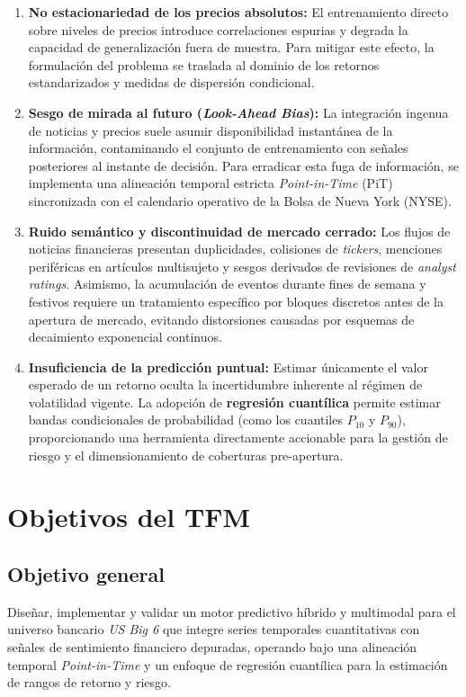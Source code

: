 \documentclass[11pt, a4paper]{report}
\begin{document}
\begin{enumerate}
    \item \textbf{No estacionariedad de los precios absolutos:} El entrenamiento directo sobre niveles de precios introduce correlaciones espurias y degrada la capacidad de generalización fuera de muestra. Para mitigar este efecto, la formulación del problema se traslada al dominio de los retornos estandarizados y medidas de dispersión condicional.
    \item \textbf{Sesgo de mirada al futuro (\textit{Look-Ahead Bias}):} La integración ingenua de noticias y precios suele asumir disponibilidad instantánea de la información, contaminando el conjunto de entrenamiento con señales posteriores al instante de decisión. Para erradicar esta fuga de información, se implementa una alineación temporal estricta \textit{Point-in-Time} (PiT) sincronizada con el calendario operativo de la Bolsa de Nueva York (NYSE).
    \item \textbf{Ruido semántico y discontinuidad de mercado cerrado:} Los flujos de noticias financieras presentan duplicidades, colisiones de \textit{tickers}, menciones periféricas en artículos multisujeto y sesgos derivados de revisiones de \textit{analyst ratings}. Asimismo, la acumulación de eventos durante fines de semana y festivos requiere un tratamiento específico por bloques discretos antes de la apertura de mercado, evitando distorsiones causadas por esquemas de decaimiento exponencial continuos.
    \item \textbf{Insuficiencia de la predicción puntual:} Estimar únicamente el valor esperado de un retorno oculta la incertidumbre inherente al régimen de volatilidad vigente. La adopción de \textbf{regresión cuantílica} permite estimar bandas condicionales de probabilidad (como los cuantiles $P_{10}$ y $P_{90}$), proporcionando una herramienta directamente accionable para la gestión de riesgo y el dimensionamiento de coberturas pre-apertura.
\end{enumerate}

\section{Objetivos del TFM}
\subsection*{Objetivo general}
Diseñar, implementar y validar un motor predictivo híbrido y multimodal para el universo bancario \textit{US Big 6} que integre series temporales cuantitativas con señales de sentimiento financiero depuradas, operando bajo una alineación temporal \textit{Point-in-Time} y un enfoque de regresión cuantílica para la estimación de rangos de retorno y riesgo.
\end{document}
